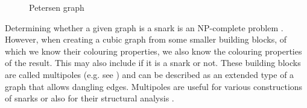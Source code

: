 \begin{figure}
	\centering
	\scalebox{0.7}{
		
	}
	\caption{Petersen graph}
	\label{fig:petersen}
\end{figure}

Determining whether a given graph is a snark is an NP-complete problem \cite{HolyerNP}. However, when creating a cubic graph from some smaller building blocks, of which we know their colouring properties, we also know the colouring properties of the result. This may also include if it is a snark or not. These building blocks are called multipoles (e.g. see \cite{Nedela1996}) and can be described as an extended type of a graph that allows dangling edges. Multipoles are useful for various constructions of snarks \cite{IrreducibleSnarksSkoviera,Lukotka15} or also for their structural analysis \cite{ChladnyFactorisation,MorphologyOfSmall}.



%


